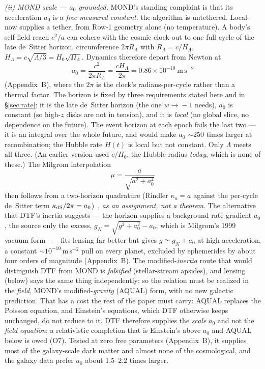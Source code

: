 \documentclass[11pt]{article}
\begin{document}
\emph{(ii) MOND scale --- $a_0$ grounded.} MOND's standing complaint is that its acceleration $a_0$ is a
\emph{free measured constant}: the algorithm is untethered. Local-now supplies a tether, from Row-1 geometry
alone (no temperature). A body's self-field reach $c^2/a$ can cohere with the cosmic clock out to one full cycle of
the late de~Sitter horizon, circumference $2\pi R_\Lambda$ with $R_\Lambda=c/H_\Lambda$, $H_\Lambda=c\sqrt{\Lambda/3}=H_0\sqrt{\Omega_\Lambda}$.
Dynamics therefore depart from Newton at
\[ a_0=\frac{c^2}{2\pi R_\Lambda}=\frac{cH_\Lambda}{2\pi}=0.86\times10^{-10}\ \mathrm{m\,s^{-2}} \]
(Appendix~B), where the $2\pi$ is the clock's radians-per-cycle rather than a thermal factor. The horizon is fixed by
three requirements stated here and in \S\ref{sec:rate}: it is the late de~Sitter horizon (the one $w\!\to\!-1$ needs), $a_0$
is constant (so high-$z$ disks are not in tension), and it is \emph{local} (no global slice, no dependence on the
future). The event horizon at each epoch fails the last two --- it is an integral over the whole future, and
would make $a_0$ $\sim\!250$ times larger at recombination; the Hubble rate $H(t)$ is local but not constant. Only
$\Lambda$ meets all three. (An earlier version used $c/H_0$, the Hubble radius \emph{today}, which is none of these.)
The Milgrom interpolation
\[ \mu=\frac{a}{\sqrt{a^2+a_0^2}} \]
then follows from a two-horizon quadrature (Rindler $\kappa_a=a$ against the per-cycle de~Sitter term
$\kappa_{\rm dS}/2\pi=a_0$)~\cite{DeserLevin1997,Milgrom1983}, \emph{as an assignment, not a theorem}. The
alternative that DTF's inertia suggests --- the horizon supplies a background rate gradient $a_0$, the source only
the excess, $g_N=\sqrt{g^2+a_0^2}-a_0$, which is Milgrom's 1999 vacuum form~\cite{Milgrom1999} --- fits lensing
far better but gives $g\simeq g_N+a_0$ at high acceleration, a constant $\sim\!10^{-10}$\,m\,s$^{-2}$ pull on every
planet, excluded by ephemerides by about four orders of magnitude (Appendix~B). The modified-\emph{inertia}
route that would distinguish DTF from MOND is \emph{falsified} (stellar-stream apsides), and lensing (below) says
the same thing independently; so the relation must be realized in the \emph{field}, MOND's modified-\emph{gravity}
(AQUAL) form, with no new galactic prediction. That has a cost the rest of the paper must
carry: AQUAL replaces the Poisson equation, and Einstein's equations, which DTF otherwise keeps unchanged, do not
reduce to it. DTF therefore supplies the \emph{scale} $a_0$ and not the \emph{field equation}; a relativistic
completion that is Einstein's above $a_0$ and AQUAL below is owed (O7). Tested at zero free parameters
(Appendix~B), it supplies most of the galaxy-scale dark matter and almost none of the cosmological, and the
galaxy data prefer $a_0$ about $1.5$--$2.2$ times larger.
\end{document}
